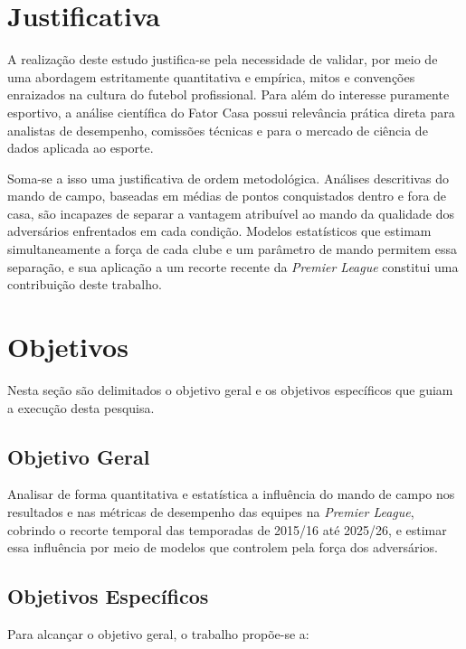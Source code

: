 \section{Justificativa}\label{sec:justificativa}

A realização deste estudo justifica-se pela necessidade de validar, por meio de
uma abordagem estritamente quantitativa e empírica, mitos e convenções enraizados
na cultura do futebol profissional. Para além do interesse puramente esportivo, a
análise científica do Fator Casa possui relevância prática direta para analistas
de desempenho, comissões técnicas e para o mercado de ciência de dados aplicada
ao esporte.

Soma-se a isso uma justificativa de ordem metodológica. Análises descritivas do
mando de campo, baseadas em médias de pontos conquistados dentro e fora de casa,
são incapazes de separar a vantagem atribuível ao mando da qualidade dos
adversários enfrentados em cada condição. Modelos estatísticos que estimam
simultaneamente a força de cada clube e um parâmetro de mando permitem essa
separação, e sua aplicação a um recorte recente da \textit{Premier League}
constitui uma contribuição deste trabalho.

\section{Objetivos}\label{sec:objetivos}

Nesta seção são delimitados o objetivo geral e os objetivos específicos que
guiam a execução desta pesquisa.

\subsection{Objetivo Geral}\label{sec:objetivo-geral}

Analisar de forma quantitativa e estatística a influência do mando de campo nos
resultados e nas métricas de desempenho das equipes na \textit{Premier League},
cobrindo o recorte temporal das temporadas de 2015/16 até 2025/26, e estimar essa
influência por meio de modelos que controlem pela força dos adversários.

\subsection{Objetivos Específicos}\label{sec:objetivos-especificos}

Para alcançar o objetivo geral, o trabalho propõe-se a:

